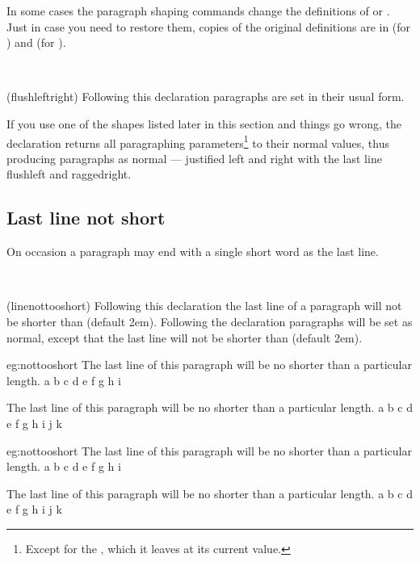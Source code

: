    In some cases the paragraph shaping commands change the definitions 
of \cmd{\\} or . Just in case you need to restore them, copies
of the original definitions are in
\cmd{\memorigdbs} (for \cmd{\\}) and \cmd{\memorigpar} (for ).

\begin{syntax}
\cmd{\flushleftright} \\
\end{syntax}
\glossary(flushleftright)%
  {}%
  {Following this declaration paragraphs are set in their usual form.}

    If you use one of the shapes listed later in this section and things
go wrong, the declaration \cmd{\flushleftright} returns all paragraphing
parameters\footnote{Except for the , which it leaves at its
current value.} 
to their normal values, thus producing paragraphs as normal ---
justified left and right with the last line flushleft and raggedright.

    
\subsection{Last line not short}

    On occasion a paragraph may end with a single short word as the last
line.

\begin{syntax}
\cmd{\linenottooshort} \\
\end{syntax}
\glossary(linenottooshort)%
  {}%
  {Following this declaration the last line of a paragraph will not be
   shorter than  (default 2em).}
Following the \cmd{\linenottooshort} declaration paragraphs will be set
as normal, except that the last line will not be shorter than
 (default 2em).


\begin{egresult}{eg:nottooshort}
\linenottooshort[4em]
The last line of this paragraph will be no shorter than a particular
length. a b c d e f g h i %

The last line of this paragraph will be no shorter than a particular
length. a b c d e f g h i j k %
\end{egresult}

\begin{egsource}{eg:nottooshort}
\linenottooshort[4em]
The last line of this paragraph will be no shorter than a particular
length. a b c d e f g h i %

The last line of this paragraph will be no shorter than a particular
length. a b c d e f g h i j k %
\end{egsource}

